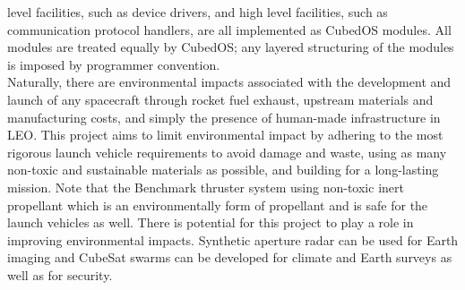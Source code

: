 level facilities, such as device drivers, and high level facilities,
such as communication protocol handlers, are all implemented as
CubedOS modules. All modules are treated equally by CubedOS; any
layered structuring of the modules is imposed by programmer
convention.
\\
Naturally, there are environmental impacts associated with the development and launch of any spacecraft through rocket fuel exhaust, upstream materials and manufacturing costs, and simply the presence of human-made infrastructure in LEO. This project aims to limit environmental impact by adhering to the most rigorous launch vehicle requirements to avoid damage and waste, using as many non-toxic and sustainable materials as possible, and building for a long-lasting mission. Note that the Benchmark thruster system using non-toxic inert propellant which is an environmentally form of propellant and is safe for the launch vehicles as well. There is potential for this project to play a role in improving environmental impacts. Synthetic aperture radar can be used for Earth imaging and CubeSat swarms can be developed for climate and Earth surveys as well as for security.
